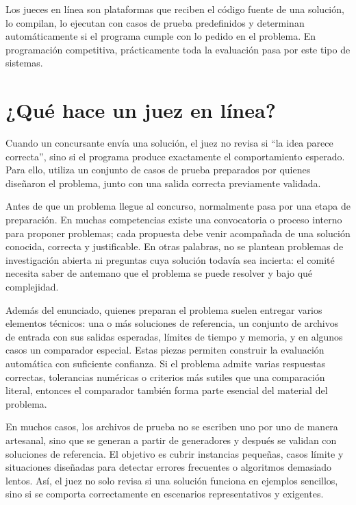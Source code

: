 

Los jueces en línea son plataformas que reciben el código fuente de una solución, lo compilan, lo ejecutan con casos de prueba predefinidos y determinan automáticamente si el programa cumple con lo pedido en el problema. En programación competitiva, prácticamente toda la evaluación pasa por este tipo de sistemas.

\section{¿Qué hace un juez en línea?}

Cuando un concursante envía una solución, el juez no revisa si ``la idea parece correcta'', sino si el programa produce exactamente el comportamiento esperado. Para ello, utiliza un conjunto de casos de prueba preparados por quienes diseñaron el problema, junto con una salida correcta previamente validada.

Antes de que un problema llegue al concurso, normalmente pasa por una etapa de preparación. En muchas competencias existe una convocatoria o proceso interno para proponer problemas; cada propuesta debe venir acompañada de una solución conocida, correcta y justificable. En otras palabras, no se plantean problemas de investigación abierta ni preguntas cuya solución todavía sea incierta: el comité necesita saber de antemano que el problema se puede resolver y bajo qué complejidad.

Además del enunciado, quienes preparan el problema suelen entregar varios elementos técnicos: una o más soluciones de referencia, un conjunto de archivos de entrada con sus salidas esperadas, límites de tiempo y memoria, y en algunos casos un comparador especial. Estas piezas permiten construir la evaluación automática con suficiente confianza. Si el problema admite varias respuestas correctas, tolerancias numéricas o criterios más sutiles que una comparación literal, entonces el comparador también forma parte esencial del material del problema.

En muchos casos, los archivos de prueba no se escriben uno por uno de manera artesanal, sino que se generan a partir de generadores y después se validan con soluciones de referencia. El objetivo es cubrir instancias pequeñas, casos límite y situaciones diseñadas para detectar errores frecuentes o algoritmos demasiado lentos. Así, el juez no solo revisa si una solución funciona en ejemplos sencillos, sino si se comporta correctamente en escenarios representativos y exigentes.

